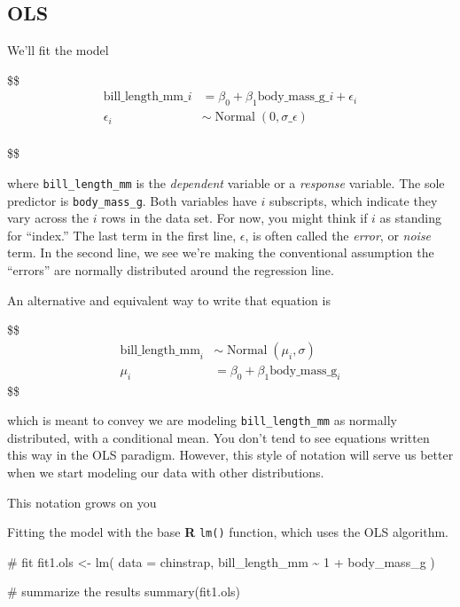 \documentclass[
  letterpaper,
  DIV=11,
  numbers=noendperiod]{scrartcl}
\newenvironment{Shaded}{\begin{snugshade}}{\end{snugshade}}
\newcommand{\AttributeTok}[1]{\textcolor[rgb]{0.40,0.45,0.13}{#1}}
\newcommand{\CommentTok}[1]{\textcolor[rgb]{0.37,0.37,0.37}{#1}}
\newcommand{\DecValTok}[1]{\textcolor[rgb]{0.68,0.00,0.00}{#1}}
\newcommand{\FunctionTok}[1]{\textcolor[rgb]{0.28,0.35,0.67}{#1}}
\newcommand{\NormalTok}[1]{\textcolor[rgb]{0.00,0.23,0.31}{#1}}
\newcommand{\OtherTok}[1]{\textcolor[rgb]{0.00,0.23,0.31}{#1}}
\newcommand{\SpecialCharTok}[1]{\textcolor[rgb]{0.37,0.37,0.37}{#1}}
\begin{document}
\subsection{OLS}\label{ols}

We'll fit the model

\$\$ \begin{align}

\text{bill_length_mm}\_i &= \beta_0 + \beta_1 \text{body_mass_g}\_i + \epsilon_i \\

\epsilon_i &\sim \operatorname{Normal}(0, \sigma\_\epsilon) \\

\end{align}

\$\$

where \texttt{bill\_length\_mm} is the \emph{dependent} variable or a
\emph{response} variable. The sole predictor is \texttt{body\_mass\_g}.
Both variables have \(i\) subscripts, which indicate they vary across
the \(i\) rows in the data set. For now, you might think if \(i\) as
standing for ``index.'' The last term in the first line, \(\epsilon\),
is often called the \emph{error}, or \emph{noise} term. In the second
line, we see we're making the conventional assumption the ``errors'' are
normally distributed around the regression line.

An alternative and equivalent way to write that equation is

\$\$ \begin{align}

\text{bill_length_mm}_i &\sim \operatorname{Normal}(\mu_i, \sigma) \\
\mu_i &= \beta_0 + \beta_1 \text{body_mass_g}_i

\end{align} \$\$

which is meant to convey we are modeling \texttt{bill\_length\_mm} as
normally distributed, with a conditional mean. You don't tend to see
equations written this way in the OLS paradigm. However, this style of
notation will serve us better when we start modeling our data with other
distributions.

This notation grows on you

Fitting the model with the base \textbf{R} \texttt{lm()} function, which
uses the OLS algorithm.

\begin{Shaded}
\begin{Highlighting}[]
\CommentTok{\# fit}
\NormalTok{fit1.ols }\OtherTok{\textless{}{-}} \FunctionTok{lm}\NormalTok{(}
  \AttributeTok{data =}\NormalTok{ chinstrap,}
\NormalTok{  bill\_length\_mm }\SpecialCharTok{\textasciitilde{}} \DecValTok{1} \SpecialCharTok{+}\NormalTok{ body\_mass\_g}
\NormalTok{)}

\CommentTok{\# summarize the results}
\FunctionTok{summary}\NormalTok{(fit1.ols)}
\end{Highlighting}
\end{Shaded}
\end{document}
